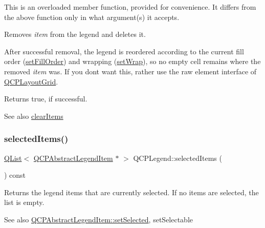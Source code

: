This is an overloaded member function, provided for convenience. It differs from the above function only in what argument(s) it accepts.

Removes {\itshape item} from the legend and deletes it.

After successful removal, the legend is reordered according to the current fill order (\hyperlink{class_q_c_p_layout_grid_affc2f3cfd22f28698c5b29b960d2a391}{set\+Fill\+Order}) and wrapping (\hyperlink{class_q_c_p_layout_grid_ab36af18d77e4428386d02970382ee598}{set\+Wrap}), so no empty cell remains where the removed {\itshape item} was. If you don\textquotesingle{}t want this, rather use the raw element interface of \hyperlink{class_q_c_p_layout_grid}{Q\+C\+P\+Layout\+Grid}.

Returns true, if successful.

\begin{DoxySeeAlso}{See also}
\hyperlink{class_q_c_p_legend_a24795c7250eb5214fcea16b7217b4dfb}{clear\+Items} 
\end{DoxySeeAlso}
\mbox{\label{class_q_c_p_legend_ac7d9e567d5c551e09cd9bcc4306c5532}} 
\subsubsection{\texorpdfstring{selected\+Items()}{selectedItems()}}
{\footnotesize\ttfamily \hyperlink{class_q_list}{Q\+List}$<$ \hyperlink{class_q_c_p_abstract_legend_item}{Q\+C\+P\+Abstract\+Legend\+Item} $\ast$ $>$ Q\+C\+P\+Legend\+::selected\+Items (\begin{DoxyParamCaption}{ }\end{DoxyParamCaption}) const}

Returns the legend items that are currently selected. If no items are selected, the list is empty.

\begin{DoxySeeAlso}{See also}
\hyperlink{class_q_c_p_abstract_legend_item_a6eed93b0ab99cb3eabb043fb08179c2b}{Q\+C\+P\+Abstract\+Legend\+Item\+::set\+Selected}, set\+Selectable 
\end{DoxySeeAlso}
\mbox{\label{class_q_c_p_legend_a82c88464edac07a9eefaf3906268df3b}} 
